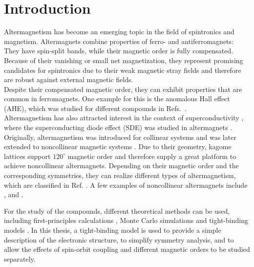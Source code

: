 \chapter{Introduction}

\label{chapter: Introduction}
Altermagnetism has become an emerging topic in the field of spintronics and magnetism. Altermagnets combine properties of ferro- and antiferromagnets: They have spin-split bands, while their magnetic order is fully compensated. Because of their vanishing or small net magnetization, they represent promising candidates for spintronics due to their weak magnetic stray fields and therefore are robust against external magnetic fields.\\
Despite their compensated magnetic order, they can exhibit properties that are common in ferromagnets. One example for this is the anomalous Hall effect (AHE), which was studied for different compounds in Refs.~\cite{PhysRevB.111.184407, Quelle2, MnPtSOC}. \\
Altermagnetism has also attracted interest in the context of superconductivity \cite{PhysRevB.108.224421},  where the superconducting diode effect (SDE)  was studied in altermagnets \cite{cv8s-tk4c, Quelle3}. \\

Originally, altermagnetism was introduced for collinear systems \cite{PhysRevX.12.040501} and was later extended to noncollinear magnetic systems \cite{Cheong2024, Cheong2025}. Due to their geometry, kagome lattices support $120^\circ$ magnetic order and therefore supply a great platform to achieve noncollinear altermagnets. Depending on their magnetic order and the corresponding symmetries, they can realize different types of altermagnetism, which are classified in Ref. \cite{Cheong2025}. A few examples of noncollinear altermagnets include ,  and .

For the study of the compounds, different theoretical methods can be used, including first-principles calculations \cite{Quelle2, Yang_2017}, Monte Carlo simulations \cite{9d8q-cjk7} and tight-binding models \cite{PhysRevB.99.165141}.
In this thesis, a tight-binding model is used to provide a simple description of the electronic structure, to simplify symmetry analysis, and to allow the effects of spin-orbit coupling and different magnetic orders to be studied separately. \\


